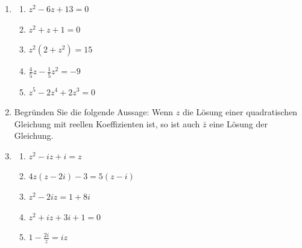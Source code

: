 \clearpage
\begin{ueb}
    {}{}
    \begin{enumerate}
        \item \begin{enumerate}
            \item\( z^2 - 6z + 13 = 0 \)
            \item \( z^2 + z + 1 = 0 \)
            \item \( z^2 (2 + z^2) = 15 \)
             \item \( \frac{4}{5}z - \frac{1}{5}z^2 = -9 \)
            \item \( z^5 - 2z^4 + 2z^3 = 0 \)
        \end{enumerate}
        \item Begründen Sie die folgende Aussage: Wenn $z$ die Lösung einer quadratischen Gleichung mit reellen Koeffizienten ist, so ist auch $\bar z$ eine Lösung der Gleichung.
        \item \begin{enumerate}
            \item \( z^2 - iz + i = z \)
            \item \( 4z(z - 2i) - 3 = 5(z - i) \)
            \item \( z^2 - 2iz = 1 + 8i \)
            \item   \( z^2 + iz + 3i + 1 = 0 \)
        \item \( 1 - \frac{2i}{z} = iz \)
        \end{enumerate}
        
    \end{enumerate}
\end{ueb}

